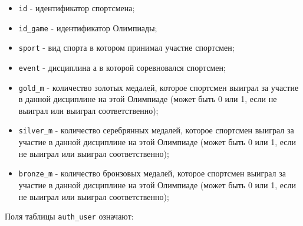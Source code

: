 \begin{itemize}
	
	\item  \texttt{id} - идентификатор спортсмена;
	
	\item  \texttt{id\_game} - идентификатор Олимпиады;
	
	\item  \texttt{sport} - вид спорта в котором принимал участие спортсмен;
	
	\item  \texttt{event} - дисциплина а в которой соревновался спортсмен;
	
	\item  \texttt{gold\_m} - количество золотых медалей, которое спортсмен выиграл за участие в данной дисциплине на этой Олимпиаде (может быть 0 или 1, если не выиграл или выиграл соответственно);
	
	\item  \texttt{silver\_m} - количество серебрянных медалей, которое спортсмен выиграл за участие в данной дисциплине на этой Олимпиаде (может быть 0 или 1, если не выиграл или выиграл соответственно);
	
	\item  \texttt{bronze\_m} - количество бронзовых медалей, которое спортсмен выиграл за участие в данной дисциплине на этой Олимпиаде (может быть 0 или 1, если не выиграл или выиграл соответственно);
	
\end{itemize}

Поля таблицы \texttt{auth\_user} означают:


